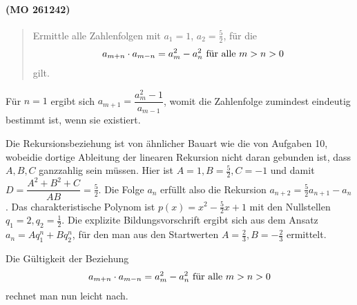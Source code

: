 \documentclass[11pt,a4paper]{article}
\begin{document}
\paragraph{(MO 261242)}
\begin{quote}
  Ermittle alle Zahlenfolgen mit $a_1=1$, $a_2=\frac52$, für die
  \begin{gather*}
    a_{m+n}\cdot a_{m-n}=a_m^2-a_n^2\ \text{für alle}\ m>n>0
  \end{gather*}
  gilt.
\end{quote}
\begin{loesung}
  Für $n=1$ ergibt sich $a_{m+1}=\dfrac{a_m^2-1}{a_{m-1}}$, womit die
  Zahlenfolge zumindest eindeutig bestimmt ist, wenn sie existiert.

  Die Rekursionsbeziehung ist von ähnlicher Bauart wie die von Aufgaben 10,
  wobeidie dortige Ableitung der linearen Rekursion nicht daran gebunden ist,
  dass $A,B,C$ ganzzahlig sein müssen.  Hier ist $A=1, B=\frac52, C=-1$ und
  damit $D=\dfrac{A^2+B^2+C}{AB}=\frac52$.  Die Folge $a_n$ erfüllt also die
  Rekursion $a_{n+2}=\frac52a_{n+1}-a_n$.  Das charakteristische Polynom ist
  $p(x)=x^2-\frac52x+1$ mit den Nullstellen $q_1=2, q_2=\frac12$.  Die
  explizite Bildungsvorschrift ergibt sich aus dem Ansatz $a_n=Aq_1^n+Bq_2^n$,
  für den man aus den Startwerten $A=\frac23, B=-\frac23$ ermittelt.

  Die Gültigkeit der Beziehung
  \begin{gather*}
    a_{m+n}\cdot a_{m-n}=a_m^2-a_n^2\ \text{für alle}\ m>n>0
  \end{gather*}
  rechnet man nun leicht nach.
\end{loesung}
\end{document}
